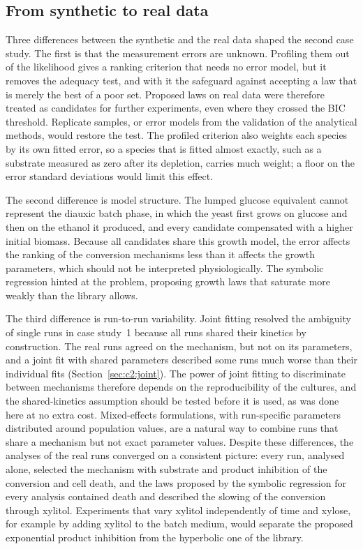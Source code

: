 \subsection{From synthetic to real data}
Three differences between the synthetic and the real data shaped the second case study. The first is that the measurement errors are unknown. Profiling them out of the likelihood gives a ranking criterion that needs no error model, but it removes the adequacy test, and with it the safeguard against accepting a law that is merely the best of a poor set. Proposed laws on real data were therefore treated as candidates for further experiments, even where they crossed the BIC threshold. Replicate samples, or error models from the validation of the analytical methods, would restore the test. The profiled criterion also weights each species by its own fitted error, so a species that is fitted almost exactly, such as a substrate measured as zero after its depletion, carries much weight; a floor on the error standard deviations would limit this effect.

The second difference is model structure. The lumped glucose equivalent cannot represent the diauxic batch phase, in which the yeast first grows on glucose and then on the ethanol it produced, and every candidate compensated with a higher initial biomass. Because all candidates share this growth model, the error affects the ranking of the conversion mechanisms less than it affects the growth parameters, which should not be interpreted physiologically. The symbolic regression hinted at the problem, proposing growth laws that saturate more weakly than the library allows.

The third difference is run-to-run variability. Joint fitting resolved the ambiguity of single runs in case study~1 because all runs shared their kinetics by construction. The real runs agreed on the mechanism, but not on its parameters, and a joint fit with shared parameters described some runs much worse than their individual fits (Section~\ref{sec:c2:joint}). The power of joint fitting to discriminate between mechanisms therefore depends on the reproducibility of the cultures, and the shared-kinetics assumption should be tested before it is used, as was done here at no extra cost. Mixed-effects formulations, with run-specific parameters distributed around population values, are a natural way to combine runs that share a mechanism but not exact parameter values. Despite these differences, the analyses of the real runs converged on a consistent picture: every run, analysed alone, selected the mechanism with substrate and product inhibition of the conversion and cell death, and the laws proposed by the symbolic regression for every analysis contained death and described the slowing of the conversion through xylitol. Experiments that vary xylitol independently of time and xylose, for example by adding xylitol to the batch medium, would separate the proposed exponential product inhibition from the hyperbolic one of the library.
